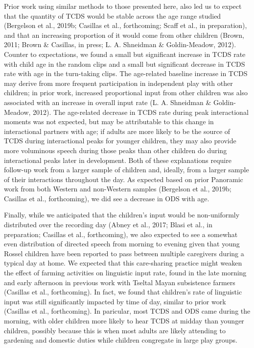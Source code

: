 \documentclass[,man,floatsintext]{apa6}
\begin{document}
Prior work using similar methods to those presented here, also led us to
expect that the quantity of TCDS would be stable across the age range
studied (Bergelson et al., 2019b; Casillas et al., forthcoming; Scaff et
al., in preparation), and that an increasing proportion of it would come
from other children (Brown, 2011; Brown \& Casillas, in press; L. A.
Shneidman \& Goldin-Meadow, 2012). Counter to expectations, we found a
small but significant increase in TCDS rate with child age in the random
clips and a small but significant decrease in TCDS rate with age in the
turn-taking clips. The age-related baseline increase in TCDS may derive
from more frequent participation in independent play with other
children; in prior work, increased proportional input from other
children was also associated with an increase in overall input rate (L.
A. Shneidman \& Goldin-Meadow, 2012). The age-related decrease in TCDS
rate during peak interactional moments was not expected, but may be
attributable to this change in interactional partners with age; if
adults are more likely to be the source of TCDS during interactional
peaks for younger children, they may also provide more voluminous speech
during those peaks than other children do during interactional peaks
later in development. Both of these explanations require follow-up work
from a larger sample of children and, ideally, from a larger sample of
their interactions throughout the day. As expected based on prior
Panoramic work from both Western and non-Western samples (Bergelson et
al., 2019b; Casillas et al., forthcoming), we did see a decrease in ODS
with age.

Finally, while we anticipated that the children's input would be
non-uniformly distributed over the recording day (Abney et al., 2017;
Blasi et al., in preparation; Casillas et al., forthcoming), we also
expected to see a somewhat even distribution of directed speech from
morning to evening given that young Rossel children have been reported
to pass between multiple caregivers during a typical day at home. We
expected that this care-sharing practice might weaken the effect of
farming activities on linguistic input rate, found in the late morning
and early afternoon in previous work with Tseltal Mayan subsistence
farmers (Casillas et al., forthcoming). In fact, we found that
children's rate of linguistic input was still significantly impacted by
time of day, similar to prior work (Casillas et al., forthcoming). In
paricular, most TCDS and ODS came during the morning, with older
children more likely to hear TCDS at midday than younger children,
possibly because this is when most adults are likely attending to
gardening and domestic duties while children congregate in large play
groups.
\end{document}
